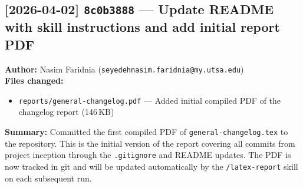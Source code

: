 \documentclass[12pt,a4paper]{article}
\begin{document}
\subsection*{[2026-04-02] \texttt{8c0b3888} --- Update README with skill instructions and add initial report PDF}

\textbf{Author:} Nasim Faridnia (\texttt{seyedehnasim.faridnia@my.utsa.edu}) \\[0.3em]
\textbf{Files changed:}
\begin{itemize}
  \item \texttt{reports/general-changelog.pdf} --- Added initial compiled PDF of the changelog report (146\,KB)
\end{itemize}

\vspace{0.3em}
\textbf{Summary:} Committed the first compiled PDF of \texttt{general-changelog.tex} to the
repository. This is the initial version of the report covering all commits from project
inception through the \texttt{.gitignore} and README updates. The PDF is now tracked in git
and will be updated automatically by the \texttt{/latex-report} skill on each subsequent run.
\end{document}
